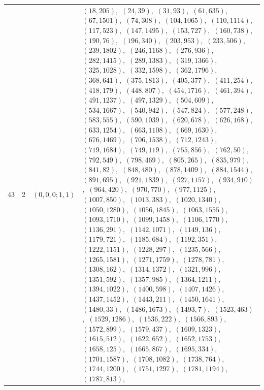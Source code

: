 \documentclass[11pt]{article}
\begin{document}
\begin{longtable}{@{}rrl>{\raggedright\arraybackslash}p{}@{}}
43 & 2 & $(0,0,0;1,1)$ & $(18,205)$,\allowbreak\ $(24,39)$,\allowbreak\ $(31,93)$,\allowbreak\ $(61,635)$,\allowbreak\ $(67,1501)$,\allowbreak\ $(74,308)$,\allowbreak\ $(104,1065)$,\allowbreak\ $(110,1114)$,\allowbreak\ $(117,523)$,\allowbreak\ $(147,1495)$,\allowbreak\ $(153,727)$,\allowbreak\ $(160,738)$,\allowbreak\ $(190,76)$,\allowbreak\ $(196,340)$,\allowbreak\ $(203,953)$,\allowbreak\ $(233,506)$,\allowbreak\ $(239,1802)$,\allowbreak\ $(246,1168)$,\allowbreak\ $(276,936)$,\allowbreak\ $(282,1415)$,\allowbreak\ $(289,1383)$,\allowbreak\ $(319,1366)$,\allowbreak\ $(325,1028)$,\allowbreak\ $(332,1598)$,\allowbreak\ $(362,1796)$,\allowbreak\ $(368,641)$,\allowbreak\ $(375,1813)$,\allowbreak\ $(405,377)$,\allowbreak\ $(411,254)$,\allowbreak\ $(418,179)$,\allowbreak\ $(448,807)$,\allowbreak\ $(454,1716)$,\allowbreak\ $(461,394)$,\allowbreak\ $(491,1237)$,\allowbreak\ $(497,1329)$,\allowbreak\ $(504,609)$,\allowbreak\ $(534,1667)$,\allowbreak\ $(540,942)$,\allowbreak\ $(547,824)$,\allowbreak\ $(577,248)$,\allowbreak\ $(583,555)$,\allowbreak\ $(590,1039)$,\allowbreak\ $(620,678)$,\allowbreak\ $(626,168)$,\allowbreak\ $(633,1254)$,\allowbreak\ $(663,1108)$,\allowbreak\ $(669,1630)$,\allowbreak\ $(676,1469)$,\allowbreak\ $(706,1538)$,\allowbreak\ $(712,1243)$,\allowbreak\ $(719,1684)$,\allowbreak\ $(749,119)$,\allowbreak\ $(755,856)$,\allowbreak\ $(762,50)$,\allowbreak\ $(792,549)$,\allowbreak\ $(798,469)$,\allowbreak\ $(805,265)$,\allowbreak\ $(835,979)$,\allowbreak\ $(841,82)$,\allowbreak\ $(848,480)$,\allowbreak\ $(878,1409)$,\allowbreak\ $(884,1544)$,\allowbreak\ $(891,695)$,\allowbreak\ $(921,1839)$,\allowbreak\ $(927,1157)$,\allowbreak\ $(934,910)$,\allowbreak\ $(964,420)$,\allowbreak\ $(970,770)$,\allowbreak\ $(977,1125)$,\allowbreak\ $(1007,850)$,\allowbreak\ $(1013,383)$,\allowbreak\ $(1020,1340)$,\allowbreak\ $(1050,1280)$,\allowbreak\ $(1056,1845)$,\allowbreak\ $(1063,1555)$,\allowbreak\ $(1093,1710)$,\allowbreak\ $(1099,1458)$,\allowbreak\ $(1106,1770)$,\allowbreak\ $(1136,291)$,\allowbreak\ $(1142,1071)$,\allowbreak\ $(1149,136)$,\allowbreak\ $(1179,721)$,\allowbreak\ $(1185,684)$,\allowbreak\ $(1192,351)$,\allowbreak\ $(1222,1151)$,\allowbreak\ $(1228,297)$,\allowbreak\ $(1235,566)$,\allowbreak\ $(1265,1581)$,\allowbreak\ $(1271,1759)$,\allowbreak\ $(1278,781)$,\allowbreak\ $(1308,162)$,\allowbreak\ $(1314,1372)$,\allowbreak\ $(1321,996)$,\allowbreak\ $(1351,592)$,\allowbreak\ $(1357,985)$,\allowbreak\ $(1364,1211)$,\allowbreak\ $(1394,1022)$,\allowbreak\ $(1400,598)$,\allowbreak\ $(1407,1426)$,\allowbreak\ $(1437,1452)$,\allowbreak\ $(1443,211)$,\allowbreak\ $(1450,1641)$,\allowbreak\ $(1480,33)$,\allowbreak\ $(1486,1673)$,\allowbreak\ $(1493,7)$,\allowbreak\ $(1523,463)$,\allowbreak\ $(1529,1286)$,\allowbreak\ $(1536,222)$,\allowbreak\ $(1566,893)$,\allowbreak\ $(1572,899)$,\allowbreak\ $(1579,437)$,\allowbreak\ $(1609,1323)$,\allowbreak\ $(1615,512)$,\allowbreak\ $(1622,652)$,\allowbreak\ $(1652,1753)$,\allowbreak\ $(1658,125)$,\allowbreak\ $(1665,867)$,\allowbreak\ $(1695,334)$,\allowbreak\ $(1701,1587)$,\allowbreak\ $(1708,1082)$,\allowbreak\ $(1738,764)$,\allowbreak\ $(1744,1200)$,\allowbreak\ $(1751,1297)$,\allowbreak\ $(1781,1194)$,\allowbreak\ $(1787,813)$,\allowbreak\ 
\end{longtable}
\end{document}
